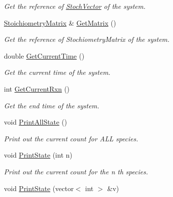 \begin{CompactItemize}
\begin{CompactList}\small\item\em Get the reference of \hyperlink{class_stoch_vector}{StochVector} of the system. \item\end{CompactList}\item 
\hypertarget{class_base_system_1b61ada1941cc65d367a36f68c3903bd}{
\hyperlink{class_stoichiometry_matrix}{StoichiometryMatrix} \& \hyperlink{class_base_system_1b61ada1941cc65d367a36f68c3903bd}{GetMatrix} ()}
\label{class_base_system_1b61ada1941cc65d367a36f68c3903bd}

\begin{CompactList}\small\item\em Get the reference of StochiometryMatrix of the system. \item\end{CompactList}\item 
\hypertarget{class_base_system_341d3006acb3815582da8a77a8151905}{
double \hyperlink{class_base_system_341d3006acb3815582da8a77a8151905}{GetCurrentTime} ()}
\label{class_base_system_341d3006acb3815582da8a77a8151905}

\begin{CompactList}\small\item\em Get the current time of the system. \item\end{CompactList}\item 
int \hyperlink{class_base_system_6e2f63d433e05bd2588e42436503db46}{GetCurrentRxn} ()
\begin{CompactList}\small\item\em Get the end time of the system. \item\end{CompactList}\item 
void \hyperlink{class_base_system_b2ac8b52857e07bef302f8f5636ad6f0}{PrintAllState} ()
\begin{CompactList}\small\item\em Print out the current count for ALL species. \item\end{CompactList}\item 
void \hyperlink{class_base_system_4be2edc5013da51b3e05e9b8dbe82548}{PrintState} (int n)
\begin{CompactList}\small\item\em Print out the current count for the n th species. \item\end{CompactList}\item 
\hypertarget{class_base_system_2d68146defa28149cf333df27096232c}{
void \hyperlink{class_base_system_2d68146defa28149cf333df27096232c}{PrintState} (vector$<$ int $>$ \&v)}
\label{class_base_system_2d68146defa28149cf333df27096232c}


\end{CompactItemize}
